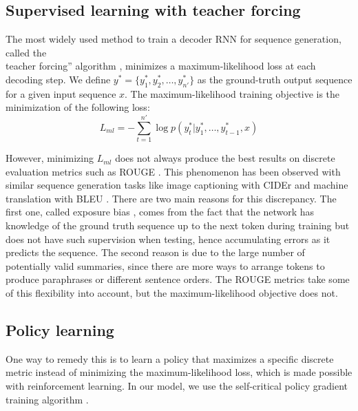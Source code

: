 \documentclass{article} \usepackage{iclr2018_arxiv,times}
\begin{document}
\subsection{Supervised learning with teacher forcing}

The most widely used method to train a decoder RNN for sequence generation, called the\\teacher forcing'' algorithm \citep{williams1989}, minimizes a maximum-likelihood loss at each decoding step. We define $y^* = \{y^*_1, y^*_2, \ldots, y^*_{n'}\}$ as the ground-truth output sequence for a given input sequence $x$. The maximum-likelihood training objective is the minimization of the following loss:
\begin{equation}
L_{ml} = -\sum_{t=1}^{n'} \log p(y^*_t | y^*_1, \ldots, y^*_{t-1}, x)
\label{eq:ml-loss}
\end{equation}

However, minimizing $L_{ml}$ does not always produce the best results on discrete evaluation metrics such as ROUGE \citep{lin2004}. This phenomenon has been observed with similar sequence generation tasks like image captioning with CIDEr \citep{rennie2016} and machine translation with BLEU \citep{wu2016,norouzi2016}. There are two main reasons for this discrepancy. The first one, called exposure bias \citep{ranzato2015}, comes from the fact that the network has knowledge of the ground truth sequence up to the next token during training but does not have such supervision when testing, hence accumulating errors as it predicts the sequence. The second reason is due to the large number of potentially valid summaries, since there are more ways to arrange tokens to produce paraphrases or different sentence orders. The ROUGE metrics take some of this flexibility into account, but the maximum-likelihood objective does not. 

\subsection{Policy learning}

One way to remedy this is to learn a policy that maximizes a specific discrete metric instead of minimizing the maximum-likelihood loss, which is made possible with reinforcement learning. In our model, we use the self-critical policy gradient training algorithm \citep{rennie2016}.
\end{document}
